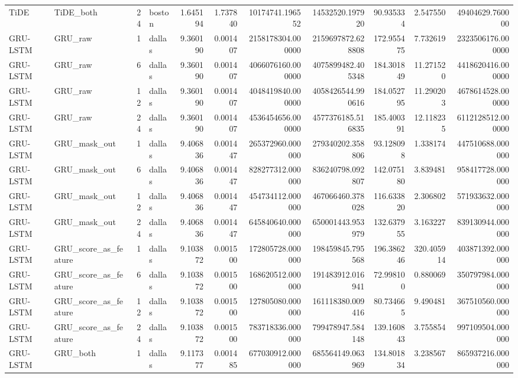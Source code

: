 \begin{longtable}{llrlrrrrrrr}
TiDE & TiDE\_both & 24 & boston & 1.645194 & 1.737840 & 10174741.196552 & 14532520.197920 & 90.935334 & 2.547550 & 49404629.760000 \\
GRU-LSTM & GRU\_raw & 1 & dallas & 9.360190 & 0.001407 & 2158178304.000000 & 2159697872.628808 & 172.955475 & 7.732619 & 2323506176.000000 \\
GRU-LSTM & GRU\_raw & 6 & dallas & 9.360190 & 0.001407 & 4066076160.000000 & 4075899482.405348 & 184.301849 & 11.271520 & 4418620416.000000 \\
GRU-LSTM & GRU\_raw & 12 & dallas & 9.360190 & 0.001407 & 4048419840.000000 & 4058426544.990616 & 184.052795 & 11.290203 & 4678614528.000000 \\
GRU-LSTM & GRU\_raw & 24 & dallas & 9.360190 & 0.001407 & 4536454656.000000 & 4577376185.516835 & 185.400391 & 12.118235 & 6112128512.000000 \\
GRU-LSTM & GRU\_mask\_out & 1 & dallas & 9.406836 & 0.001447 & 265372960.000000 & 279340202.358806 & 93.128098 & 1.338174 & 447510688.000000 \\
GRU-LSTM & GRU\_mask\_out & 6 & dallas & 9.406836 & 0.001447 & 828277312.000000 & 836240798.092807 & 142.075180 & 3.839481 & 958417728.000000 \\
GRU-LSTM & GRU\_mask\_out & 12 & dallas & 9.406836 & 0.001447 & 454734112.000000 & 467066460.378028 & 116.633820 & 2.306802 & 571933632.000000 \\
GRU-LSTM & GRU\_mask\_out & 24 & dallas & 9.406836 & 0.001447 & 645840640.000000 & 650001443.953979 & 132.637955 & 3.163227 & 839130944.000000 \\
GRU-LSTM & GRU\_score\_as\_feature & 1 & dallas & 9.103872 & 0.001500 & 172805728.000000 & 198459845.795568 & 196.386246 & 320.405914 & 403871392.000000 \\
GRU-LSTM & GRU\_score\_as\_feature & 6 & dallas & 9.103872 & 0.001500 & 168620512.000000 & 191483912.016941 & 72.998100 & 0.880069 & 350797984.000000 \\
GRU-LSTM & GRU\_score\_as\_feature & 12 & dallas & 9.103872 & 0.001500 & 127805080.000000 & 161118380.009416 & 80.734665 & 9.490481 & 367510560.000000 \\
GRU-LSTM & GRU\_score\_as\_feature & 24 & dallas & 9.103872 & 0.001500 & 783718336.000000 & 799478947.584148 & 139.160843 & 3.755854 & 997109504.000000 \\
GRU-LSTM & GRU\_both & 1 & dallas & 9.117377 & 0.001485 & 677030912.000000 & 685564149.063969 & 134.801834 & 3.238567 & 865937216.000000 \\

\end{longtable}
